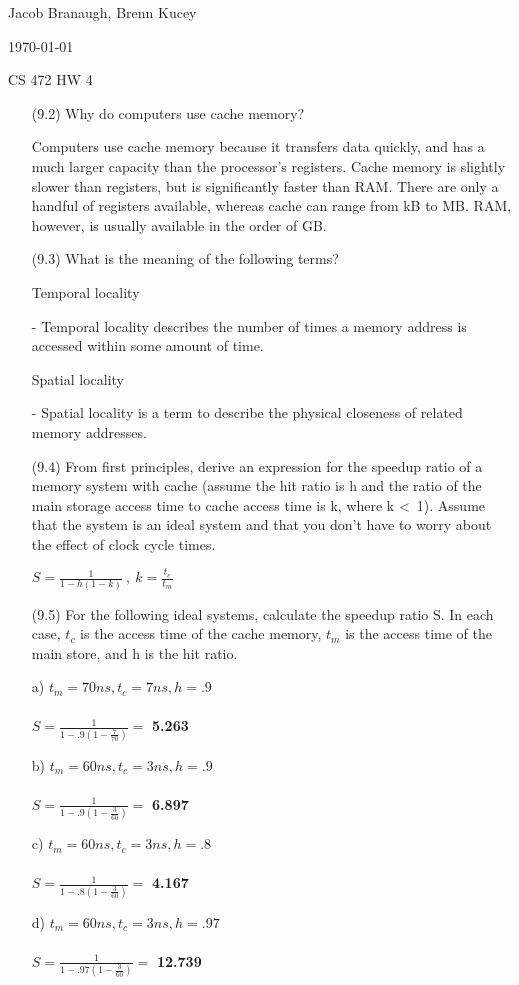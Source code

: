 \documentclass[letterpaper,10pt,titlepage]{article}
\def\name{Jacob Branaugh, Brenn Kucey}
\begin{document}
\hfill \name

\hfill \today

\hfill CS 472 HW 4

\begin{enumerate}
	\item[(9.2)] Why do computers use cache memory?
	\item[\textbullet] Computers use cache memory because it transfers data quickly,
		and has a much larger capacity than the processor's registers. Cache
		memory is slightly slower than registers, but is significantly faster than
		RAM. There are only a handful of registers available, whereas cache can
		range from kB to MB. RAM, however, is usually available in the order of
		GB.

	\item[(9.3)] What is the meaning of the following terms?
	\item[\textbullet] Temporal locality
	\item[-] Temporal locality describes the number of times a memory address is
		accessed within some amount of time.
	\item[\textbullet] Spatial locality
	\item[-] Spatial locality is a term to describe the physical closeness of related
		memory addresses.

	\item[(9.4)] From first principles, derive an expression for the speedup ratio of
		a memory system with cache (assume the hit ratio is h and the ratio of the
		main storage access time to cache access time is k, where k \textless\ 1). 
		Assume that the system is an ideal system and that you don't have to worry 
		about the effect of clock cycle times.
	\item[\textbullet] $S=\frac{1}{1-h(1-k)}\ ,\ k = \frac{t_{c}}{t_{m}}$

	\item[(9.5)] For the following ideal systems, calculate the speedup ratio S. In
		each case, $t_{c}$ is the access time of the cache memory, $t_{m}$ is the
		access time of the main store, and h is the hit ratio.
	\item[a)] $t_{m} = 70ns, t_{c} = 7ns, h = .9$ \\ \\
		$S=\frac{1}{1-.9(1-\frac{7}{70})}=$ \textbf{5.263}
	\item[b)] $t_{m} = 60ns, t_{c} = 3ns, h = .9$ \\ \\
		$S=\frac{1}{1-.9(1-\frac{3}{60})}=$ \textbf{6.897}
	\item[c)] $t_{m} = 60ns, t_{c} = 3ns, h = .8$ \\ \\
		$S=\frac{1}{1-.8(1-\frac{3}{60})}=$ \textbf{4.167}
	\item[d)] $t_{m} = 60ns, t_{c} = 3ns, h = .97$ \\ \\
		$S=\frac{1}{1-.97(1-\frac{3}{60})}=$ \textbf{12.739}


\end{enumerate}
\end{document}
